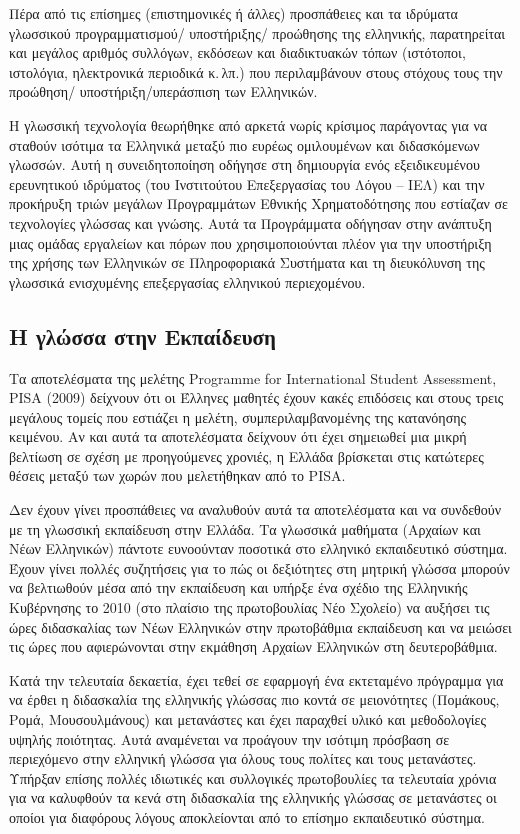 \begin{multicols}{2}
Πέρα από τις επίσημες (επιστημονικές ή άλλες) προσπάθειες και τα ιδρύματα γλωσσικού προγραμματισμού/ υποστήριξης/ προώθησης της ελληνικής, παρατηρείται και μεγάλος αριθμός συλλόγων, εκδόσεων και διαδικτυακών τόπων (ιστότοποι, ιστολόγια, ηλεκτρονικά περιοδικά κ.\,λπ.) που περιλαμβάνουν στους στόχους τους την προώθηση/ υποστήριξη/υπεράσπιση των Ελληνικών.

Η γλωσσική τεχνολογία θεωρήθηκε από αρκετά νωρίς κρίσιμος παράγοντας για να σταθούν ισότιμα τα  Ελληνικά μεταξύ πιο ευρέως ομιλουμένων και διδασκόμενων γλωσσών. Αυτή η συνειδητοποίηση οδήγησε στη δημιουργία ενός εξειδικευμένου ερευνητικού ιδρύματος (του Ινστιτούτου Επεξεργασίας του Λόγου – ΙΕΛ) και την προκήρυξη τριών μεγάλων Προγραμμάτων Εθνικής Χρηματοδότησης που εστίαζαν σε τεχνολογίες γλώσσας και γνώσης. Αυτά τα Προγράμματα οδήγησαν στην ανάπτυξη μιας ομάδας εργαλείων και πόρων που χρησιμοποιούνται πλέον για την υποστήριξη της χρήσης των Ελληνικών σε Πληροφοριακά Συστήματα και τη διευκόλυνση της γλωσσικά ενισχυμένης επεξεργασίας ελληνικού περιεχομένου.

\subsection{Η γλώσσα στην Εκπαίδευση}

Τα αποτελέσματα της μελέτης Programme for International Student Assessment, PISA (2009) \cite{Pisa2} δείχνουν ότι οι Έλληνες μαθητές έχουν κακές επιδόσεις και στους τρεις μεγάλους τομείς που εστιάζει η μελέτη, συμπεριλαμβανομένης της κατανόησης κειμένου. Αν και αυτά τα αποτελέσματα δείχνουν ότι έχει σημειωθεί μια μικρή βελτίωση σε σχέση με προηγούμενες χρονιές, η Ελλάδα βρίσκεται στις κατώτερες θέσεις μεταξύ των χωρών που μελετήθηκαν από το PISA.

Δεν έχουν γίνει προσπάθειες  να αναλυθούν αυτά τα αποτελέσματα και να συνδεθούν με τη γλωσσική εκπαίδευση στην Ελλάδα. Τα γλωσσικά μαθήματα (Αρχαίων και Νέων Ελληνικών) πάντοτε ευνοούνταν ποσοτικά στο ελληνικό εκπαιδευτικό σύστημα. Έχουν γίνει πολλές συζητήσεις για το πώς οι δεξιότητες στη μητρική γλώσσα μπορούν να βελτιωθούν μέσα από την εκπαίδευση και υπήρξε ένα σχέδιο της Ελληνικής Κυβέρνησης το 2010 (στο πλαίσιο της πρωτοβουλίας Νέο Σχολείο) να αυξήσει τις ώρες διδασκαλίας των Νέων Ελληνικών στην πρωτοβάθμια εκπαίδευση και να μειώσει τις ώρες που αφιερώνονται στην εκμάθηση Αρχαίων Ελληνικών στη δευτεροβάθμια.

Κατά την τελευταία δεκαετία, έχει τεθεί σε εφαρμογή ένα εκτεταμένο πρόγραμμα για να έρθει η διδασκαλία της ελληνικής γλώσσας πιο κοντά σε μειονότητες (Πομάκους, Ρομά, Μουσουλμάνους) και μετανάστες και έχει παραχθεί υλικό και μεθοδολογίες υψηλής ποιότητας. Αυτά αναμένεται να προάγουν την ισότιμη πρόσβαση σε περιεχόμενο στην ελληνική γλώσσα για όλους τους πολίτες και τους μετανάστες. Υπήρξαν επίσης πολλές ιδιωτικές και συλλογικές πρωτοβουλίες τα τελευταία χρόνια για να καλυφθούν τα κενά στη διδασκαλία της ελληνικής γλώσσας σε μετανάστες οι οποίοι για διαφόρους λόγους αποκλείονται από το επίσημο εκπαιδευτικό σύστημα.


\end{multicols}
